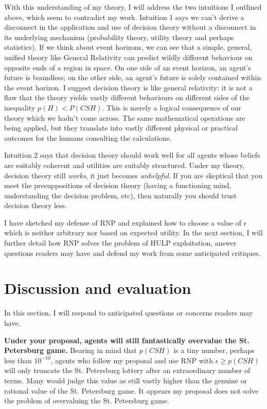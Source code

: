 \documentclass{article}
\begin{document}
With this understanding of my theory, I will address the two intuitions I outlined above, which seem to contradict my work. Intuition 1 says we can't derive a disconnect in the application and use of decision theory without a disconnect in its underlying mechanism (probability theory, utility theory and perhaps statistics). If we think about event horizons, we can see that a simple, general, unified theory like General Relativity can predict wildly different behaviour on opposite ends of a region in space. On one side of an event horizon, an agent's future is boundless; on the other side, an agent's future is solely contained within the event horizon. I suggest decision theory is like general relativity: it is not a flaw that the theory yields vastly different behaviours on different sides of the inequality \(p(H)<P(CSH)\). This is merely a logical consequence of our theory which we hadn't come across. The same mathematical operations are being applied, but they translate into vastly different physical or practical outcomes for the humans consulting the calculations.

Intuition 2 says that decision theory should work well for all agents whose beliefs are suitably coherent and utilities are suitably structured. Under my theory, decision theory still \textit{works}, it just becomes \textit{unhelpful}. If you are skeptical that you meet the presuppositions of decision theory (having a functioning mind, understanding the decision problem, etc), then naturally you should trust decision theory less.

I have sketched my defense of RNP and explained how to choose a value of \(\epsilon\) which is neither arbitrary nor based on expected utility. In the next section, I will further detail how RNP solves the problem of HULP exploitation, answer questions readers may have and defend my work from some anticipated critiques. 

\section{Discussion and evaluation}

In this section, I will respond to anticipated questions or concerns readers may have. 

\textbf{Under your proposal, agents will still fantastically overvalue the St. Petersburg game.} Bearing in mind that \(p(CSH)\) is a tiny number, perhaps less than \(10^{-10}\), agents who follow my proposal and use RNP with \(\epsilon \geq p(CSH)\) will only truncate the St. Petersburg lottery after an extraordinary number of terms. Many would judge this value as still vastly higher than the genuine or rational value of the St. Petersburg game. It appears my proposal does not solve the problem of overvaluing the St. Petersburg game. 
\end{document}
